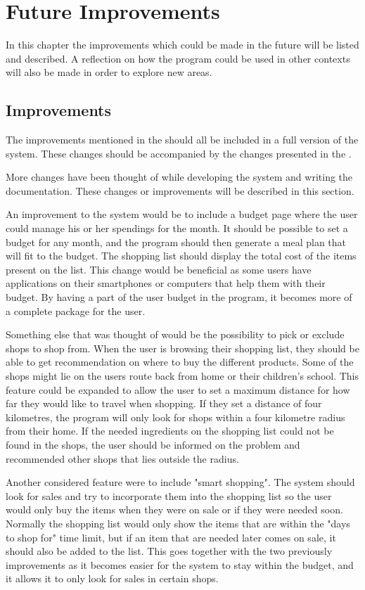 \chapter{Future Improvements}
In this chapter the improvements which could be made in the future will be listed and described. A reflection on how the program could be used in other contexts will also be made in order to explore new areas.

\section{Improvements}
The improvements mentioned in the  should all be included in a full version of the system. These changes should be accompanied by the changes presented in the .

More changes have been thought of while developing the system and writing the documentation. These changes or improvements will be described in this section.

An improvement to the system would be to include a budget page where the user could manage his or her spendings for the month. It should be possible to set a budget for any month, and the program should then generate a meal plan that will fit to the budget. The shopping list should display the total cost of the items present on the list. This change would be beneficial as some users have applications on their smartphones or computers that help them with their budget. By having a part of the user budget in the program, it becomes more of a complete package for the user.

Something else that was thought of would be the possibility to pick or exclude shops to shop from. When the user is browsing their shopping list, they should be able to get recommendation on where to buy the different products. Some of the shops might lie on the users route back from home or their children's school. This feature could be expanded to allow the user to set a maximum distance for how far they would like to travel when shopping. If they set a distance of four kilometres, the program will only look for shops within a four kilometre radius from their home. If the needed ingredients on the shopping list could not be found in the shops, the user should be informed on the problem and recommended other shops that lies outside the radius.

Another considered feature were to include "smart shopping". The system should look for sales and try to incorporate them into the shopping list so the user would only buy the items when they were on sale or if they were needed soon. Normally the shopping list would only show the items that are within the "days to shop for" time limit, but if an item that are needed later comes on sale, it should also be added to the list. This goes together with the two previously improvements as it becomes easier for the system to stay within the budget, and it allows it to only look for sales in certain shops.

